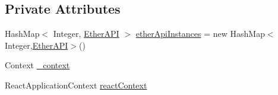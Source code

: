 \subsection*{Private Attributes}
\begin{DoxyCompactItemize}
\item 
Hash\+Map$<$ Integer, \mbox{\hyperlink{classcom_1_1ethernom_1_1android_1_1etherapi_1_1_ether_a_p_i}{Ether\+A\+PI}} $>$ \mbox{\hyperlink{classcom_1_1ethernom_1_1android_1_1etherapi_1_1_ether_a_p_i_manager_aa98d8974d5e1603aadf95acd406cd09a}{ether\+Api\+Instances}} = new Hash\+Map$<$Integer,\mbox{\hyperlink{classcom_1_1ethernom_1_1android_1_1etherapi_1_1_ether_a_p_i}{Ether\+A\+PI}}$>$()
\item 
Context \mbox{\hyperlink{classcom_1_1ethernom_1_1android_1_1etherapi_1_1_ether_a_p_i_manager_a3c3da1f62427e3f1bda96b1d2a69b23d}{\+\_\+context}}
\item 
React\+Application\+Context \mbox{\hyperlink{classcom_1_1ethernom_1_1android_1_1etherapi_1_1_ether_a_p_i_manager_a6c6e5a9d5f4aa434d52a6b2ef9d80289}{react\+Context}}
\end{DoxyCompactItemize}

